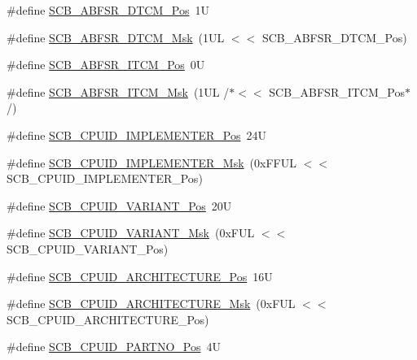 \begin{DoxyCompactItemize}
\item 
\#define \mbox{\hyperlink{group___c_m_s_i_s___s_c_b_ga46e22bfb92f4344807714dfa987b7cf3}{S\+C\+B\+\_\+\+A\+B\+F\+S\+R\+\_\+\+D\+T\+C\+M\+\_\+\+Pos}}~1U
\item 
\#define \mbox{\hyperlink{group___c_m_s_i_s___s_c_b_ga0f48b9b3b5e79c83383ff9506a75f423}{S\+C\+B\+\_\+\+A\+B\+F\+S\+R\+\_\+\+D\+T\+C\+M\+\_\+\+Msk}}~(1\+U\+L $<$$<$ S\+C\+B\+\_\+\+A\+B\+F\+S\+R\+\_\+\+D\+T\+C\+M\+\_\+\+Pos)
\item 
\#define \mbox{\hyperlink{group___c_m_s_i_s___s_c_b_gaf7c22a977aed73cd51317c25286e81c6}{S\+C\+B\+\_\+\+A\+B\+F\+S\+R\+\_\+\+I\+T\+C\+M\+\_\+\+Pos}}~0U
\item 
\#define \mbox{\hyperlink{group___c_m_s_i_s___s_c_b_gaa8cd31cf3adbe7445c733c0a0a4779da}{S\+C\+B\+\_\+\+A\+B\+F\+S\+R\+\_\+\+I\+T\+C\+M\+\_\+\+Msk}}~(1\+U\+L /$\ast$$<$$<$ S\+C\+B\+\_\+\+A\+B\+F\+S\+R\+\_\+\+I\+T\+C\+M\+\_\+\+Pos$\ast$/)
\item 
\#define \mbox{\hyperlink{group___c_m_s_i_s___s_c_b_ga58686b88f94f789d4e6f429fe1ff58cf}{S\+C\+B\+\_\+\+C\+P\+U\+I\+D\+\_\+\+I\+M\+P\+L\+E\+M\+E\+N\+T\+E\+R\+\_\+\+Pos}}~24U
\item 
\#define \mbox{\hyperlink{group___c_m_s_i_s___s_c_b_ga0932b31faafd47656a03ced75a31d99b}{S\+C\+B\+\_\+\+C\+P\+U\+I\+D\+\_\+\+I\+M\+P\+L\+E\+M\+E\+N\+T\+E\+R\+\_\+\+Msk}}~(0x\+F\+F\+U\+L $<$$<$ S\+C\+B\+\_\+\+C\+P\+U\+I\+D\+\_\+\+I\+M\+P\+L\+E\+M\+E\+N\+T\+E\+R\+\_\+\+Pos)
\item 
\#define \mbox{\hyperlink{group___c_m_s_i_s___s_c_b_ga104462bd0815391b4044a70bd15d3a71}{S\+C\+B\+\_\+\+C\+P\+U\+I\+D\+\_\+\+V\+A\+R\+I\+A\+N\+T\+\_\+\+Pos}}~20U
\item 
\#define \mbox{\hyperlink{group___c_m_s_i_s___s_c_b_gad358dfbd04300afc1824329d128b99e8}{S\+C\+B\+\_\+\+C\+P\+U\+I\+D\+\_\+\+V\+A\+R\+I\+A\+N\+T\+\_\+\+Msk}}~(0x\+F\+U\+L $<$$<$ S\+C\+B\+\_\+\+C\+P\+U\+I\+D\+\_\+\+V\+A\+R\+I\+A\+N\+T\+\_\+\+Pos)
\item 
\#define \mbox{\hyperlink{group___c_m_s_i_s___s_c_b_gaf8b3236b08fb8e840efb682645fb0e98}{S\+C\+B\+\_\+\+C\+P\+U\+I\+D\+\_\+\+A\+R\+C\+H\+I\+T\+E\+C\+T\+U\+R\+E\+\_\+\+Pos}}~16U
\item 
\#define \mbox{\hyperlink{group___c_m_s_i_s___s_c_b_gafae4a1f27a927338ae9dc51a0e146213}{S\+C\+B\+\_\+\+C\+P\+U\+I\+D\+\_\+\+A\+R\+C\+H\+I\+T\+E\+C\+T\+U\+R\+E\+\_\+\+Msk}}~(0x\+F\+U\+L $<$$<$ S\+C\+B\+\_\+\+C\+P\+U\+I\+D\+\_\+\+A\+R\+C\+H\+I\+T\+E\+C\+T\+U\+R\+E\+\_\+\+Pos)
\item 
\#define \mbox{\hyperlink{group___c_m_s_i_s___s_c_b_ga705f68eaa9afb042ca2407dc4e4629ac}{S\+C\+B\+\_\+\+C\+P\+U\+I\+D\+\_\+\+P\+A\+R\+T\+N\+O\+\_\+\+Pos}}~4U

\end{DoxyCompactItemize}
